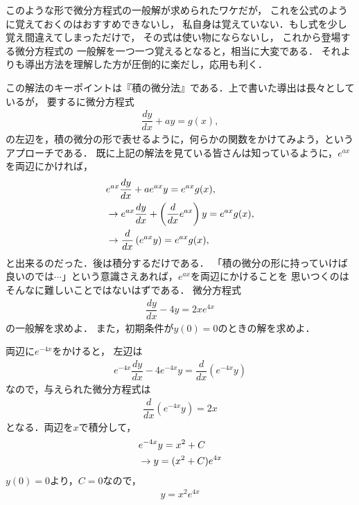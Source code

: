 このような形で微分方程式の一般解が求められたワケだが，
これを公式のように覚えておくのはおすすめできないし，
私自身は覚えていない．もし式を少し覚え間違えてしまっただけで，
その式は使い物にならないし，
これから登場する微分方程式の
一般解を一つ一つ覚えるとなると，相当に大変である．
それよりも導出方法を理解した方が圧倒的に楽だし，応用も利く．

この解法のキーポイントは『積の微分法』である．上で書いた導出は長々としているが，
要するに微分方程式
\begin{align}
 \dfrac{dy}{dx} + ay = g(x), 
\end{align}
の左辺を，積の微分の形で表せるように，何らかの関数をかけてみよう，というアプローチである．
既に上記の解法を見ている皆さんは知っているように，$e^{ax}$を両辺にかければ，
\begin{align}
 & e^{ax}\dfrac{dy}{dx} + ae^{ax}y = e^{ax}g(x), \notag \\
 & \rightarrow e^{ax}\dfrac{dy}{dx} + \left(\dfrac{d}{dx}e^{ax}\right)y = e^{ax}g(x), \notag \\
 & \rightarrow \dfrac{d}{dx}\left(e^{ax}y\right) = e^{ax}g(x), \notag
\end{align}
と出来るのだった．後は積分するだけである．
「積の微分の形に持っていけば良いのでは$\cdots$」という意識さえあれば，$e^{ax}$を両辺にかけることを
思いつくのはそんなに難しいことではないはずである．
%
\newpage
%
\gl
\reidai
微分方程式
\begin{align}
  \dfrac{dy}{dx} - 4y = 2xe^{4x} 
\end{align}
の一般解を求めよ．
また，初期条件が$y(0)=0$のときの解を求めよ．
\gl

両辺に$e^{-4x}$をかけると，
左辺は
\begin{align}
 e^{-4x}\dfrac{dy}{dx} - 4e^{-4x}y = \dfrac{d}{dx}\left(e^{-4x}y\right) 
\end{align}
なので，与えられた微分方程式は
\begin{align}
 \dfrac{d}{dx}\left(e^{-4x}y\right) = 2x 
\end{align}
となる．両辺を$x$で積分して，
\begin{align}
  &e^{-4x}y = x^2 + C \notag \\
  &\rightarrow y = (x^2+C)e^{4x} 
\end{align}
$y(0)=0$より，$C=0$なので，
\begin{align}
 y = x^2 e^{4x} 
\end{align}
%
\newpage


